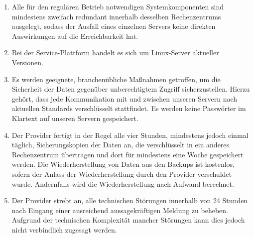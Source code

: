 \documentclass{terms}
\begin{document}
\begin{enumerate}
\item Alle für den regulären Betrieb notwendigen Systemkomponenten sind mindestens zweifach redundant innerhalb desselben Rechenzentrums ausgelegt, sodass der Ausfall eines einzelnen Servers keine direkten Auswirkungen auf die Erreichbarkeit hat.
\item Bei der Service-Plattform handelt es sich um Linux-Server aktueller Versionen.
\item Es werden geeignete, branchenübliche Maßnahmen getroffen, um die Sicherheit der Daten gegenüber unberechtigtem Zugriff sicherzustellen. Hierzu gehört, dass jede Kommunikation mit und zwischen unseren Servern nach aktuellen Standards verschlüsselt stattfindet. Es werden keine Passwörter im Klartext auf unseren Servern gespeichert.
\item Der Provider fertigt in der Regel alle vier Stunden, mindestens jedoch einmal täglich, Sicherungskopien der Daten an, die verschlüsselt in ein anderes Rechenzentrum übertragen und dort für mindestens eine Woche gespeichert werden. Die Wiederherstellung von Daten aus den Backups ist kostenlos, sofern der Anlass der Wiederherstellung durch den Provider verschuldet wurde. Andernfalls wird die Wiederherstellung nach Aufwand berechnet.
\item Der Provider strebt an, alle technischen Störungen innerhalb von 24 Stunden nach Eingang einer ausreichend aussagekräftigen Meldung zu beheben. Aufgrund der technischen Komplexität mancher Störungen kann dies jedoch nicht verbindlich zugesagt werden.
\end{enumerate}
\end{document}
